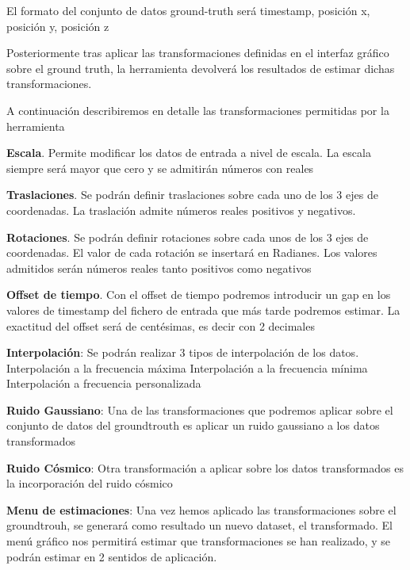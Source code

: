 El formato del conjunto de datos ground-truth será timestamp, posición x, posición y, posición z

Posteriormente tras aplicar las transformaciones definidas en el interfaz gráfico sobre el ground truth, la herramienta devolverá los resultados de estimar dichas transformaciones.


A continuación describiremos en detalle las transformaciones permitidas por la herramienta

\textbf{Escala}. Permite modificar los datos de entrada a nivel de escala. La escala siempre será mayor que cero y se admitirán números con reales

\textbf{Traslaciones}. Se podrán definir traslaciones sobre cada uno de los 3 ejes de coordenadas. 
La traslación admite números reales positivos y negativos.

\textbf{Rotaciones}. Se podrán definir rotaciones sobre cada unos de los 3 ejes de coordenadas. El valor de cada rotación se insertará en Radianes. Los valores admitidos serán números reales tanto positivos como negativos

\textbf{Offset de tiempo}. Con el offset de tiempo podremos introducir un gap en los valores de timestamp del fichero de entrada que más tarde podremos estimar. La exactitud del offset será de centésimas, es decir con 2 decimales

\textbf{Interpolación}: Se podrán realizar 3 tipos de interpolación de los datos.
	Interpolación a la frecuencia máxima
	Interpolación a la frecuencia mínima
	Interpolación a frecuencia personalizada

\textbf{Ruido Gaussiano}: Una de las transformaciones que podremos aplicar sobre el conjunto de datos del groundtrouth es aplicar un ruido gaussiano a los datos transformados

\textbf{Ruido Cósmico}: Otra transformación a aplicar sobre los datos transformados es la incorporación del ruido cósmico

\textbf{Menu de estimaciones}:
Una vez hemos aplicado las transformaciones sobre el groundtrouh, se generará como resultado un nuevo dataset, el transformado.
El menú gráfico nos permitirá estimar que transformaciones se han realizado, y se podrán estimar en 2 sentidos de aplicación.

